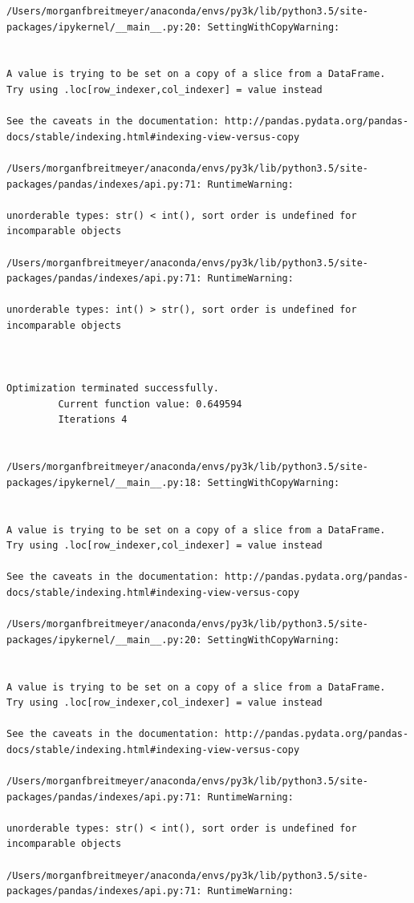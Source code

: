 \begin{lstlisting}
/Users/morganfbreitmeyer/anaconda/envs/py3k/lib/python3.5/site-packages/ipykernel/__main__.py:20: SettingWithCopyWarning:


A value is trying to be set on a copy of a slice from a DataFrame.
Try using .loc[row_indexer,col_indexer] = value instead

See the caveats in the documentation: http://pandas.pydata.org/pandas-docs/stable/indexing.html#indexing-view-versus-copy

/Users/morganfbreitmeyer/anaconda/envs/py3k/lib/python3.5/site-packages/pandas/indexes/api.py:71: RuntimeWarning:

unorderable types: str() < int(), sort order is undefined for incomparable objects

/Users/morganfbreitmeyer/anaconda/envs/py3k/lib/python3.5/site-packages/pandas/indexes/api.py:71: RuntimeWarning:

unorderable types: int() > str(), sort order is undefined for incomparable objects



Optimization terminated successfully.
         Current function value: 0.649594
         Iterations 4


/Users/morganfbreitmeyer/anaconda/envs/py3k/lib/python3.5/site-packages/ipykernel/__main__.py:18: SettingWithCopyWarning:


A value is trying to be set on a copy of a slice from a DataFrame.
Try using .loc[row_indexer,col_indexer] = value instead

See the caveats in the documentation: http://pandas.pydata.org/pandas-docs/stable/indexing.html#indexing-view-versus-copy

/Users/morganfbreitmeyer/anaconda/envs/py3k/lib/python3.5/site-packages/ipykernel/__main__.py:20: SettingWithCopyWarning:


A value is trying to be set on a copy of a slice from a DataFrame.
Try using .loc[row_indexer,col_indexer] = value instead

See the caveats in the documentation: http://pandas.pydata.org/pandas-docs/stable/indexing.html#indexing-view-versus-copy

/Users/morganfbreitmeyer/anaconda/envs/py3k/lib/python3.5/site-packages/pandas/indexes/api.py:71: RuntimeWarning:

unorderable types: str() < int(), sort order is undefined for incomparable objects

/Users/morganfbreitmeyer/anaconda/envs/py3k/lib/python3.5/site-packages/pandas/indexes/api.py:71: RuntimeWarning:


\end{lstlisting}
